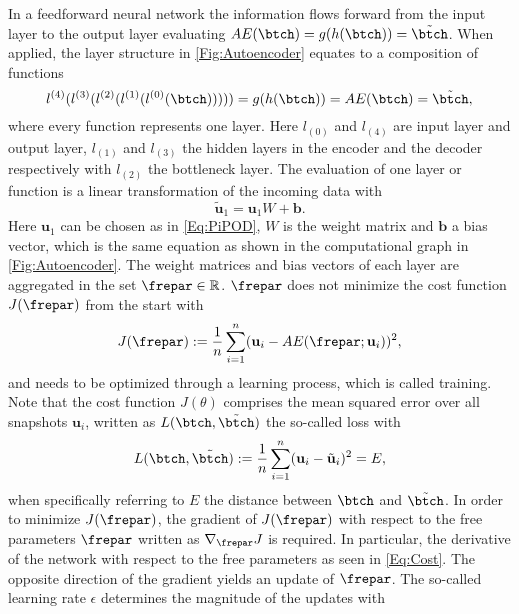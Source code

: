 In a feedforward neural network the information flows forward from the input layer to the output layer evaluating  \(AE(\btch) = g(h(\btch)) =\tilde{\btch }\). When applied, the layer structure in \cref{Fig:Autoencoder} equates to a composition of functions
	\begin{equation}
		l^{(4)}(l^{(3)}(l^{(2)}(l^{(1)}(l^{(0)}(\btch))))) = g(h(\btch)) = AE(\btch) = \tilde{\btch}\mathrm{,}
		\label{Eq:Composition}
	\end{equation}
where every function represents one layer. Here \(l_{(0)}\) and \(l_{(4)}\) are input layer and output layer, \(l_{(1)}\) and \(l_{(3)}\) the hidden layers in the encoder and the decoder respectively with \(l_{(2)}\) the bottleneck layer. The evaluation of one layer or function is a linear transformation of the incoming data with
	\begin{equation}
	\tilde{\mathbf{u}}_1 = \mathbf{u}_1W + \mathbf{b}\mathrm{.} \label{Eq:Linear Transformation}
	\end{equation}
Here \(\mathbf{u}_1\) can be chosen as in \cref{Eq:PiPOD}, \(W\) is the weight matrix and \(\mathbf{b}\) a bias vector, which is the same equation as shown in the computational graph in \cref{Fig:Autoencoder}. The weight matrices and bias vectors of each layer are aggregated in the set \(\frepar \in \mathbb{R}\). \(\frepar\) does not minimize the cost function \(J(\frepar)\) from the start with
\begin{equation}
	J(\frepar) := \frac{1}{n}\sum_{i=1}^n (\mathbf{u}_i - AE(\frepar;\mathbf{u}_i))^2\mathrm{,}
	\label{Eq:Cost}
\end{equation}
and needs to be optimized through a learning process, which is called training. Note that the cost function \(J(\theta)\) comprises the mean squared error over all snapshots \(\mathbf{u}_i\),  written as \(L(\btch,\tilde{\btch})\) the so-called loss with
\begin{equation}
	L(\btch,\tilde{\btch}) := \frac{1}{n}\sum_{i=1}^n(\mathbf{u}_i - \tilde{\mathbf{u}}_i)^2 = E \mathrm{,}
\end{equation}
when specifically referring to \(E\) the distance between \(\btch\) and $\tilde{\btch}$. In order to minimize \(J(\frepar)\), the gradient of \(J(\frepar)\) with respect to the free parameters \(\frepar\) written as \(\nabla_{\frepar}J\) is required. In particular, the derivative of the network with respect to the free parameters as seen in \cref{Eq:Cost}. The opposite direction of the gradient yields an update of \(\frepar\). The so-called learning rate \(\epsilon\) determines the magnitude of the updates with
